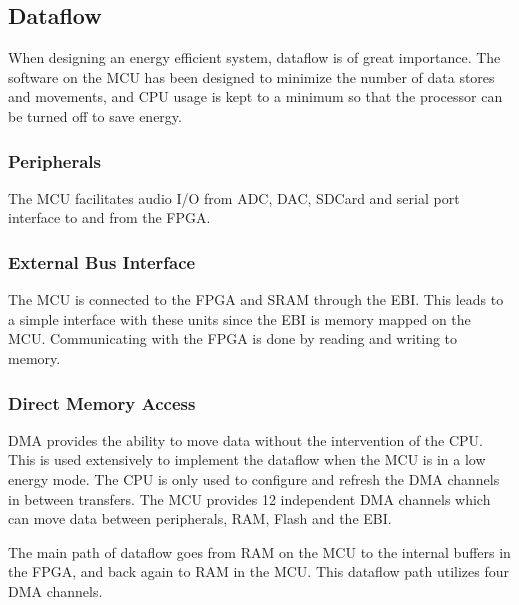 
\subsection{Dataflow}

When designing an energy efficient system, dataflow is of great importance. The
software on the MCU has been designed to minimize the number of data stores and
movements, and CPU usage is kept to a minimum so that the processor can be
turned off to save energy. 

\subsubsection{Peripherals}
The MCU facilitates audio I/O from ADC, DAC, SDCard and serial port interface to
and from the FPGA.



\subsubsection{External Bus Interface}
The MCU is connected to the FPGA and SRAM through the EBI. This leads to a
simple interface with these units since the EBI is memory mapped on the MCU.
Communicating with the FPGA is done by reading and writing to memory.


\subsubsection{Direct Memory Access} DMA provides the ability to move data
without the intervention of the CPU. This is used extensively to implement the
dataflow when the MCU is in a low energy mode. The CPU is only used to configure
and refresh the DMA channels in between transfers. The MCU provides 12
independent DMA channels which can move data between peripherals, RAM, Flash and
the EBI.

The main path of dataflow goes from RAM on the MCU to the internal buffers in
the FPGA, and back again to RAM in the MCU. This dataflow path utilizes four DMA
channels.

